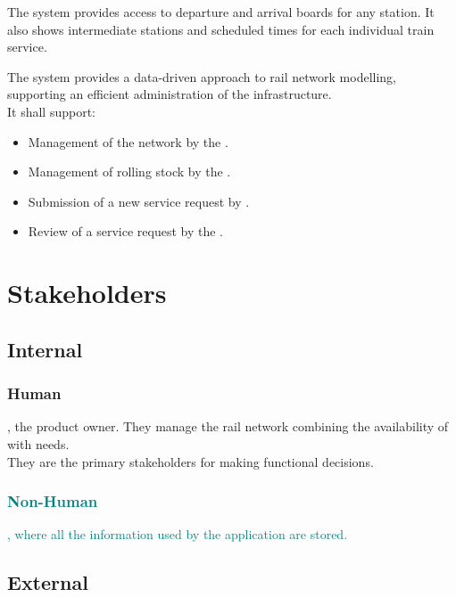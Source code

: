 The system provides  access to departure and arrival boards for any station. It also shows intermediate stations and scheduled times for each 
individual train service.

The system provides a data-driven approach to rail network modelling, supporting an efficient administration of the infrastructure.\\
It shall support:
\begin{itemize}
    \item Management of the network by the .
    \item Management of rolling stock by the .
    \item Submission of a new service request by .
    \item Review of a service request by the .
\end{itemize}
{}
\section*{Stakeholders}

\subsection*{Internal}

\subsubsection*{Human}
, the product owner. They manage the rail network combining the availability of  with  needs.\\
They are the primary stakeholders for making functional decisions.

\textcolor{teal}{
\subsubsection*{Non-Human}
, where all the information used by the application are stored.
}

\subsection*{External}

